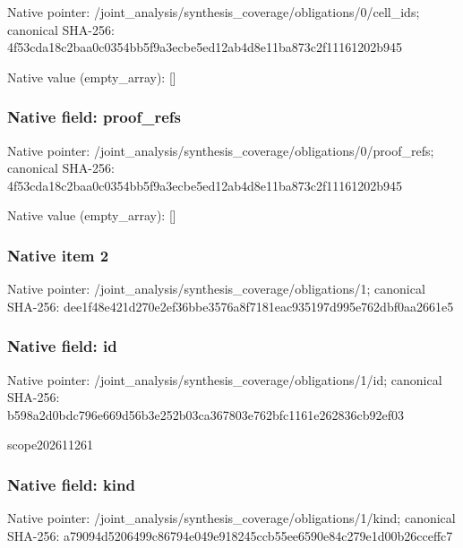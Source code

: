 \documentclass[10pt,a4paper]{article}
\begin{document}
Native pointer: /joint\_analysis/synthesi\allowbreak{}s\_coverage/obligations/0\allowbreak{}/cell\_ids; canonical SHA-256: 4f53cda18c2baa0c0354bb5f\allowbreak{}9a3ecbe5ed12ab4d8e11ba87\allowbreak{}3c2f11161202b945



Native value (empty\_array): []



\subsubsection{Native field: proof\_refs}


Native pointer: /joint\_analysis/synthesi\allowbreak{}s\_coverage/obligations/0\allowbreak{}/proof\_refs; canonical SHA-256: 4f53cda18c2baa0c0354bb5f\allowbreak{}9a3ecbe5ed12ab4d8e11ba87\allowbreak{}3c2f11161202b945



Native value (empty\_array): []



\subsubsection{Native item 2}


Native pointer: /joint\_analysis/synthesi\allowbreak{}s\_coverage/obligations/1; canonical SHA-256: dee1f48e421d270e2ef36bbe\allowbreak{}3576a8f7181eac935197d995\allowbreak{}e762dbf0aa2661e5



\subsubsection{Native field: id}


Native pointer: /joint\_analysis/synthesi\allowbreak{}s\_coverage/obligations/1\allowbreak{}/id; canonical SHA-256: b598a2d0bdc796e669d56b3e\allowbreak{}252b03ca367803e762bfc116\allowbreak{}1e262836cb92ef03


scope202611261


\subsubsection{Native field: kind}


Native pointer: /joint\_analysis/synthesi\allowbreak{}s\_coverage/obligations/1\allowbreak{}/kind; canonical SHA-256: a79094d5206499c86794e049\allowbreak{}e918245ccb55ee6590e84c27\allowbreak{}9e1d00b26cceffc7
\end{document}
